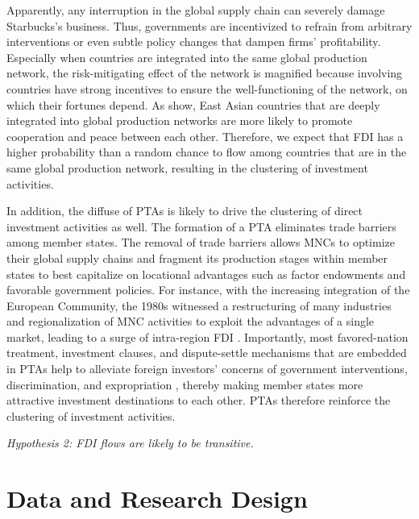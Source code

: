 \documentclass{article}
\begin{document}
Apparently, any interruption in the global supply chain can severely damage Starbucks's business. Thus, governments are incentivized to refrain from arbitrary interventions or even subtle policy changes that dampen firms' profitability. Especially when countries are integrated into the same global production network, the risk-mitigating effect of the network is magnified because involving countries have strong incentives to ensure the well-functioning of the network, on which their fortunes depend. As \citet{Kim_Solingen:2017} show, East Asian countries that are deeply integrated into global production networks are more likely to promote cooperation and peace between each other. Therefore, we expect that FDI has a higher probability than a random chance to flow among countries that are in the same global production network, resulting in the clustering of investment activities.

In addition, the diffuse of PTAs is likely to drive the clustering of direct investment activities as well. The formation of a PTA eliminates trade barriers among member states. The removal of trade barriers allows MNCs to optimize their global supply chains and fragment its production stages within member states to best capitalize on locational advantages such as factor endowments and favorable government policies. For instance, with the increasing integration of the European Community, the 1980s witnessed a restructuring of many industries and regionalization of MNC activities to exploit the advantages of a single market, leading to a surge of intra-region FDI \citep[34]{UNCTAD:1991}. Importantly, most favored-nation treatment, investment clauses, and dispute-settle mechanisms that are embedded in PTAs help to alleviate foreign investors' concerns of government interventions, discrimination, and expropriation \citep{Buthe_Milner:2008,buthe2014foreign}, thereby making member states more attractive investment destinations to each other. PTAs therefore reinforce the clustering of investment activities.

\begin{center}
\textit{Hypothesis 2: FDI flows are likely to be transitive.}
\end{center}




\section{Data and Research Design}
\end{document}
